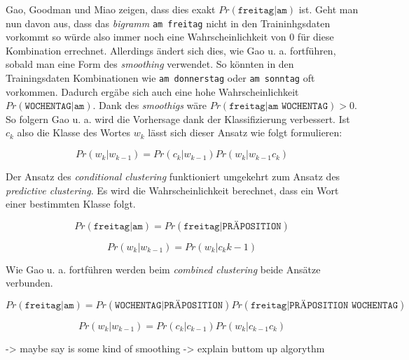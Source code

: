    Gao, Goodman und Miao zeigen, dass dies exakt \(Pr(\texttt{freitag}|\texttt{am})\) ist. Geht man nun davon aus, dass das \emph{bigramm} \texttt{am freitag} nicht in den Traininhgsdaten vorkommt so würde also immer noch eine Wahrscheinlichkeit von 0 für diese Kombination errechnet. Allerdings ändert sich dies, wie Gao u. a. fortführen, sobald man eine Form des \emph{smoothing} verwendet. So könnten in den Trainingsdaten Kombinationen wie \texttt{am donnerstag} oder \texttt{am sonntag} oft vorkommen. Dadurch ergäbe sich auch eine hohe Wahrscheinlichkeit \(Pr(\texttt{WOCHENTAG}|\texttt{am})\). Dank des \emph{smoothigs} wäre \(Pr(\texttt{freitag}|\texttt{am WOCHENTAG}) > 0\). So folgern Gao u. a. wird die Vorhersage dank der Klassifizierung verbessert. Ist \(c_k\) also die Klasse des Wortes \(w_k\) lässt sich dieser Ansatz wie folgt formulieren:
    
    \begin{equation}
   		Pr(w_k|w_{k-1}) = Pr(c_k|w_{k-1}) Pr(w_k|w_{k-1}c_k)
        \label{eq:predictive-clustering-math}
	\end{equation}
    
    Der Ansatz des \emph{conditional clustering} funktioniert  umgekehrt zum Ansatz des \emph{predictive clustering}. Es wird die Wahrscheinlichkeit berechnet, dass ein Wort einer bestimmten Klasse folgt.
    
    \begin{equation}
   		Pr(\texttt{freitag}|\texttt{am}) = Pr(\texttt{freitag}|\texttt{PRÄPOSITION})
        \label{eq:conditional-clustering-words}
	\end{equation}
    
    \begin{equation}
   		Pr(w_k|w_{k-1}) = Pr(w_k|c_k{k-1})
        \label{eq:conditional-clustering-math}
	\end{equation}
    
    Wie Gao u. a. fortführen werden beim \emph{combined clustering} beide Ansätze verbunden.
    
    \begin{equation}
   		Pr(\texttt{freitag}|\texttt{am}) = Pr(\texttt{WOCHENTAG}|\texttt{PRÄPOSITION}) Pr(\texttt{freitag}|\texttt{PRÄPOSITION WOCHENTAG})
        \label{eq:combined-clustering-words}
	\end{equation}
    
    \begin{equation}
   		Pr(w_k|w_{k-1}) = Pr(c_k|c_{k-1}) Pr(w_k|c_{k-1} c_k)
        \label{eq:combined-clustering-math}
	\end{equation}
    
    -> maybe say is some kind of smoothing    
    -> explain buttom up algorythm